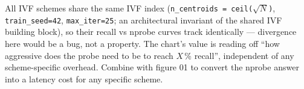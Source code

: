 All IVF schemes share the same IVF index (\texttt{n\_centroids =
ceil($\sqrt{N}$)}, \texttt{train\_seed=42},
\texttt{max\_iter=25}; an architectural invariant of the
shared IVF building block), so their recall vs nprobe curves track
identically --- divergence here would be a bug, not a property.
The chart's value is reading off ``how aggressive does the probe
need to be to reach $X$\,\% recall'', independent of any
scheme-specific overhead. Combine with figure 01 to convert the
nprobe answer into a latency cost for any specific scheme.
